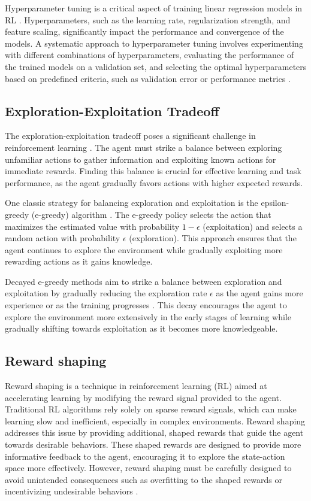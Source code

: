 Hyperparameter tuning is a critical aspect of training linear regression models in RL \cite{bergstra2012random}. Hyperparameters, such as the learning rate, regularization strength, and feature scaling, significantly impact the performance and convergence of the models. A systematic approach to hyperparameter tuning involves experimenting with different combinations of hyperparameters, evaluating the performance of the trained models on a validation set, and selecting the optimal hyperparameters based on predefined criteria, such as validation error or performance metrics \cite{russel2020ai}.

\subsection{Exploration-Exploitation Tradeoff}

The exploration-exploitation tradeoff poses a significant challenge in reinforcement learning \cite{sutton2018reinforcement}. The agent must strike a balance between exploring unfamiliar actions to gather information and exploiting known actions for immediate rewards. Finding this balance is crucial for effective learning and task performance, as the agent gradually favors actions with higher expected rewards.

One classic strategy for balancing exploration and exploitation is the epsilon-greedy (e-greedy) algorithm \cite{sutton2018reinforcement}. The e-greedy policy selects the action that maximizes the estimated value with probability $1 - \epsilon$ (exploitation) and selects a random action with probability $\epsilon$ (exploration). This approach ensures that the agent continues to explore the environment while gradually exploiting more rewarding actions as it gains knowledge.

Decayed e-greedy methods aim to strike a balance between exploration and exploitation by gradually reducing the exploration rate $\epsilon$ as the agent gains more experience or as the training progresses \cite{sutton2018reinforcement}. This decay encourages the agent to explore the environment more extensively in the early stages of learning while gradually shifting towards exploitation as it becomes more knowledgeable.

\subsection{Reward shaping}

Reward shaping is a technique in reinforcement learning (RL) aimed at accelerating learning by modifying the reward signal provided to the agent. Traditional RL algorithms rely solely on sparse reward signals, which can make learning slow and inefficient, especially in complex environments. Reward shaping addresses this issue by providing additional, shaped rewards that guide the agent towards desirable behaviors. These shaped rewards are designed to provide more informative feedback to the agent, encouraging it to explore the state-action space more effectively. However, reward shaping must be carefully designed to avoid unintended consequences such as overfitting to the shaped rewards or incentivizing undesirable behaviors \cite{russel2020ai}.
